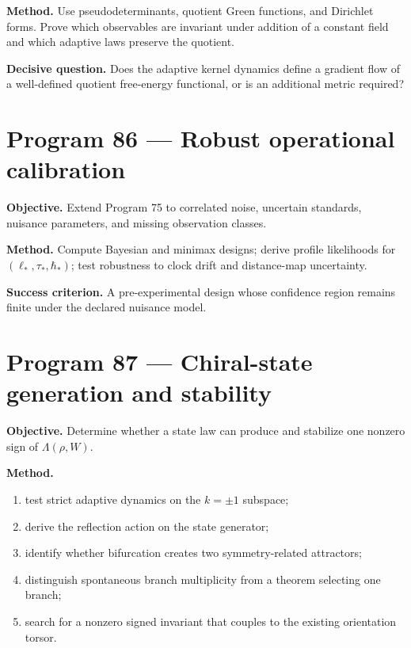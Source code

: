 \documentclass[11pt,a4paper,openany]{report}
\begin{document}
\textbf{Method.} Use pseudodeterminants, quotient Green functions, and Dirichlet forms. Prove which observables are invariant under addition of a constant field and which adaptive laws preserve the quotient.

\textbf{Decisive question.} Does the adaptive kernel dynamics define a gradient flow of a well-defined quotient free-energy functional, or is an additional metric required?

\section{Program 86 --- Robust operational calibration}

\textbf{Objective.} Extend Program 75 to correlated noise, uncertain standards, nuisance parameters, and missing observation classes.

\textbf{Method.} Compute Bayesian and minimax designs; derive profile likelihoods for \((\ell_*,\tau_*,\hbar_*)\); test robustness to clock drift and distance-map uncertainty.

\textbf{Success criterion.} A pre-experimental design whose confidence region remains finite under the declared nuisance model.

\section{Program 87 --- Chiral-state generation and stability}

\textbf{Objective.} Determine whether a state law can produce and stabilize one nonzero sign of \(\Lambda(\rho,W)\).

\textbf{Method.}

\begin{enumerate}
\item 
test strict adaptive dynamics on the \(k=\pm1\) subspace;

\item 
derive the reflection action on the state generator;

\item 
identify whether bifurcation creates two symmetry-related attractors;

\item 
distinguish spontaneous branch multiplicity from a theorem selecting one branch;

\item 
search for a nonzero signed invariant that couples to the existing orientation torsor.

\end{enumerate}
\end{document}
